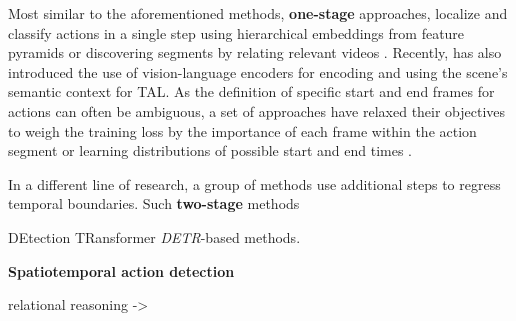 \documentclass[smallextended,twocolumn,natbib]{svjour3}
\begin{document}
Most similar to the aforementioned methods, \textbf{one-stage} approaches, localize and classify actions in a single step using hierarchical embeddings from feature pyramids \citep{lin2021learning,liu2020progressive,shi2023tridet,zhang2022actionformer} or discovering segments by relating relevant videos \citep{shou2018autoloc,yang2020localizing}. Recently, \citet{yan2023unloc} has also introduced the use of vision-language encoders for encoding and using the scene's semantic context for TAL. As the definition of specific start and end frames for actions can often be ambiguous, a set of approaches have relaxed their objectives to weigh the training loss by the importance of each frame within the action segment \citep{shao2023action} or
learning distributions of possible start and end times \citep{moltisanti2019action}. 

In a different line of research, a group of methods use additional steps to regress temporal boundaries. Such \textbf{two-stage} methods

\citep{bai2020boundary}
\citep{qing2021temporal}
\citep{zhao2021video}
\citep{chen2022dcan}
\citep{huang2019decoupling}
\citep{alwassel2021tsp}
\citep{zhang2022unsupervised}
\citep{nag2023difftad}
\citep{rizve2023pivotal}
\citep{zhang2021cola}
\citep{luo2020weakly}
\citep{liu2021weakly}
\citep{zhai2020two}
\citep{he2022asm}

DEtection TRansformer \emph{DETR}-based methods.
\citep{tan2021relaxed}
\citep{zhao2023re2tal}
\citep{cheng2022tallformer}
\citep{liu2022empirical}
\citep{cheng2022stochastic}
\citep{liu2024end}
\citep{hong2022spotting}
\citep{ju2023distilling}






\noindent
\textbf{Spatiotemporal action detection}
\citep{agarwal2020unsupervised}
\citep{peng2016multi}
\citep{gu2018ava}
\citep{singh2017online}
\citep{weinzaepfel2015learning}
\citep{zhu2024dual}
\citep{sun2018actor}
\citep{feng2021relation}
\citep{tang2020asynchronous}
\citep{yang2019step}
\citep{chen2021watch}
\citep{girdhar2019video}
\citep{faure2023holistic}
\citep{wang2023videomae}
\citep{gritsenko2024end}
\citep{chen2023efficient}
\citep{wu2023stmixer}
\citep{mettes2016spot}
\citep{kumar2022end}
\citep{ntinou2024multiscale}
\citep{dave2022gabriellav2}
\citep{wu2023newsnet}
\citep{buch2017sst}
\citep{alwassel2018diagnosing}

relational reasoning \citep{wang2018videos}-> \citep{pan2021actor}
\end{document}
